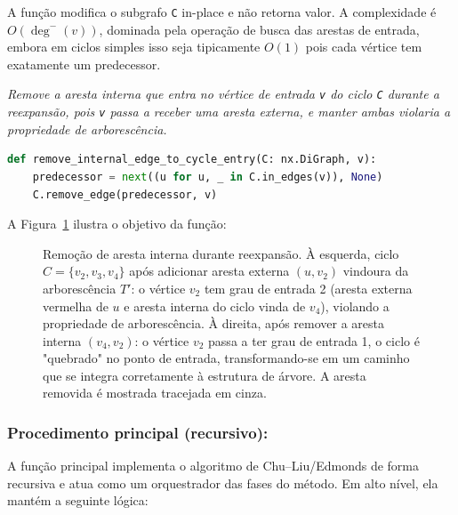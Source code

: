 A função modifica o subgrafo \texttt{C} in-place e não retorna valor. A complexidade é \(O(\deg^-(v))\), dominada pela operação de busca das arestas de entrada, embora em ciclos simples isso seja tipicamente \(O(1)\) pois cada vértice tem exatamente um predecessor.

\begin{tcolorbox}[
        enhanced, breakable,
        colframe=blue!60!black, colback=blue!2,
        colbacktitle=blue!15, coltitle=black,
        title={Remover arco interno na reexpansão},
        boxed title style={sharp corners, boxrule=0.6pt},
        sharp corners, boxrule=0.6pt
    ]
    \emph{Remove a aresta interna que entra no vértice de entrada \texttt{v} do ciclo \texttt{C} durante a reexpansão, pois \texttt{v} passa a receber uma aresta externa, e manter ambas violaria a propriedade de arborescência.}
    \tcblower
    \begin{lstlisting}[mathescape=true, language=Python]
def remove_internal_edge_to_cycle_entry(C: nx.DiGraph, v):
    predecessor = next((u for u, _ in C.in_edges(v)), None)
    C.remove_edge(predecessor, v) 
\end{lstlisting}
\end{tcolorbox}

A Figura~\ref{fig:remove-internal-edge-example} ilustra o objetivo da função:

\begin{figure}[H]
    \centering
    
    \caption{Remoção de aresta interna durante reexpansão. À esquerda, ciclo $C=\{v_2, v_3, v_4\}$ após adicionar aresta externa $(u, v_2)$ vindoura da arborescência $T'$: o vértice $v_2$ tem grau de entrada 2 (aresta externa vermelha de $u$ e aresta interna do ciclo vinda de $v_4$), violando a propriedade de arborescência. À direita, após remover a aresta interna $(v_4, v_2)$: o vértice $v_2$ passa a ter grau de entrada 1, o ciclo é "quebrado" no ponto de entrada, transformando-se em um caminho que se integra corretamente à estrutura de árvore. A aresta removida é mostrada tracejada em cinza.}
    \label{fig:remove-internal-edge-example}
\end{figure}

\subsubsection{Procedimento principal (recursivo):}
A função principal implementa o algoritmo de Chu–Liu/Edmonds de forma recursiva e atua como um orquestrador das fases do método. Em alto nível, ela mantém a seguinte lógica:

